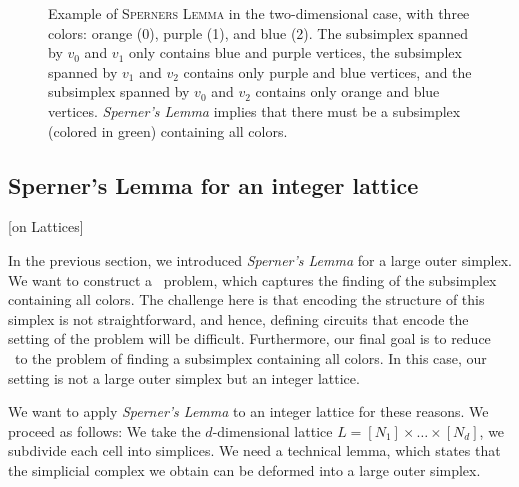 \begin{figure}[ht]
	\centering
	\caption[Example of \textsc{Sperners Lemma}]{Example of \textsc{Sperners Lemma} in the two-dimensional case, with three colors: orange (0), purple (1), and blue (2). The subsimplex spanned by $v_0$ and $v_1$ only contains blue and purple vertices, the subsimplex spanned by $v_1$ and $v_2$ contains only purple and blue vertices, and the subsimplex spanned by $v_0$ and $v_2$ contains only orange and blue vertices. \textit{Sperner's Lemma} implies that there must be a subsimplex (colored in green) containing all colors.}
	\label{fig:sperner_lemma_example}
\end{figure}

\subsection{Sperner's Lemma for an integer lattice}[on Lattices]

In the previous section, we introduced \textit{Sperner's Lemma} for a large outer simplex. We want to construct a \TFNP\ problem, which captures the finding of the subsimplex containing all colors. The challenge here is that encoding the structure of this simplex is not straightforward, and hence, defining circuits that encode the setting of the problem will be difficult. Furthermore, our final goal is to reduce \Tarskistar\ to the problem of finding a subsimplex containing all colors. In this case, our setting is not a large outer simplex but an integer lattice.

We want to apply \textit{Sperner's Lemma} to an integer lattice for these reasons. We proceed as follows: We take the $d$-dimensional lattice $L = [N_1] \times \dots \times [N_d]$, we subdivide each cell into simplices. We need a technical lemma, which states that the simplicial complex we obtain can be deformed into a large outer simplex.

